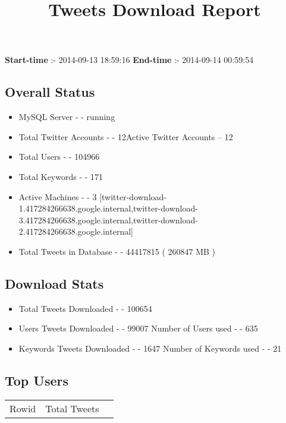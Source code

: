 \documentclass{article}\usepackage[T1]{fontenc}
\begin{document}
\title{\textbf{Tweets Download Report}}
               \date{}
                \maketitle
               \centerline{\textbf{Start-time} :- 2014-09-13 18:59:16 \hspace{40pt} \textbf{End-time} :- 2014-09-14 00:59:54}               \subsection*{Overall Status}                \begin{itemize}                \item MySQL Server - - running               \item Total Twitter Accounts - - 12\newline Active Twitter Accounts -- 12               \item Total Users - - 104966               \item Total Keywords - - 171               \item Active Machines - - 3 [twitter-download-1.417284266638.google.internal,twitter-download-3.417284266638.google.internal,twitter-download-2.417284266638.google.internal]               \item Total Tweets in Database - - 44417815 ( 260847 MB )               \end{itemize}               \subsection*{Download Stats}                \begin{itemize}                \item Total Tweets Downloaded - - 100654               \item Users Tweets Downloaded - - 99007 \newline Number of Users used - - 635               \item Keywords Tweets Downloaded - - 1647 \newline Number of Keywords used - - 21              \end{itemize}              \subsection*{Top Users}\begin{tabular}{|c|c|c|}         \hline         Rowid & Total Tweets \\ 

\end{tabular}
\end{document}

